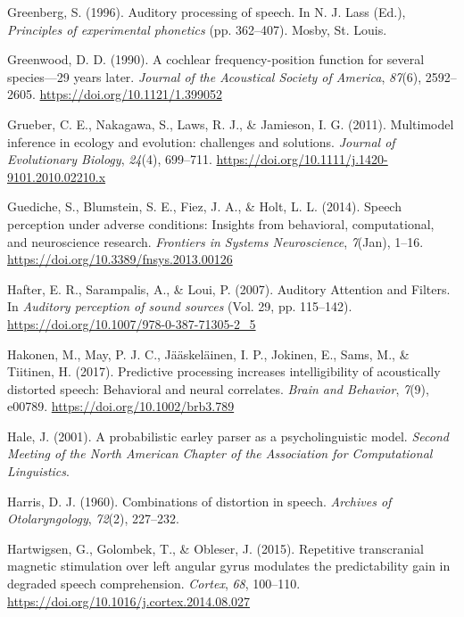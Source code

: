 \documentclass[a4paper, nobind]{templates/ociamthesis}
\newlength{\cslhangindent}
\newenvironment{CSLReferences}[2] %
 {%
  \setlength{\parindent}{0pt}
  \ifodd #1
  \let\oldpar\par
  \def\par{\hangindent=\cslhangindent\oldpar}
  \fi
  \setlength{\parskip}{1mm}
  \setlength{\baselineskip}{6mm}
 }%
 {}
\begin{document}
\begin{CSLReferences}{1}{0}
\leavevmode{}%
Greenberg, S. (1996). Auditory processing of speech. In N. J. Lass (Ed.), \emph{Principles of experimental phonetics} (pp. 362--407). Mosby, St. Louis.

\leavevmode{}%
Greenwood, D. D. (1990). {A cochlear frequency-position function for several species---29 years later}. \emph{Journal of the Acoustical Society of America}, \emph{87}(6), 2592--2605. \url{https://doi.org/10.1121/1.399052}

\leavevmode{}%
Grueber, C. E., Nakagawa, S., Laws, R. J., \& Jamieson, I. G. (2011). Multimodel inference in ecology and evolution: challenges and solutions. \emph{Journal of Evolutionary Biology}, \emph{24}(4), 699--711. \url{https://doi.org/10.1111/j.1420-9101.2010.02210.x}

\leavevmode{}%
Guediche, S., Blumstein, S. E., Fiez, J. A., \& Holt, L. L. (2014). {Speech perception under adverse conditions: Insights from behavioral, computational, and neuroscience research}. \emph{Frontiers in Systems Neuroscience}, \emph{7}(Jan), 1--16. \url{https://doi.org/10.3389/fnsys.2013.00126}

\leavevmode{}%
Hafter, E. R., Sarampalis, A., \& Loui, P. (2007). {Auditory Attention and Filters}. In \emph{Auditory perception of sound sources} (Vol. 29, pp. 115--142). \url{https://doi.org/10.1007/978-0-387-71305-2_5}

\leavevmode{}%
Hakonen, M., May, P. J. C., Jääskeläinen, I. P., Jokinen, E., Sams, M., \& Tiitinen, H. (2017). Predictive processing increases intelligibility of acoustically distorted speech: Behavioral and neural correlates. \emph{Brain and Behavior}, \emph{7}(9), e00789. \url{https://doi.org/10.1002/brb3.789}

\leavevmode{}%
Hale, J. (2001). A probabilistic earley parser as a psycholinguistic model. \emph{Second Meeting of the North American Chapter of the Association for Computational Linguistics}.

\leavevmode{}%
Harris, D. J. (1960). {Combinations of distortion in speech}. \emph{Archives of Otolaryngology}, \emph{72}(2), 227--232.

\leavevmode{}%
Hartwigsen, G., Golombek, T., \& Obleser, J. (2015). Repetitive transcranial magnetic stimulation over left angular gyrus modulates the predictability gain in degraded speech comprehension. \emph{Cortex}, \emph{68}, 100--110. \url{https://doi.org/10.1016/j.cortex.2014.08.027}


\end{CSLReferences}
\end{document}
